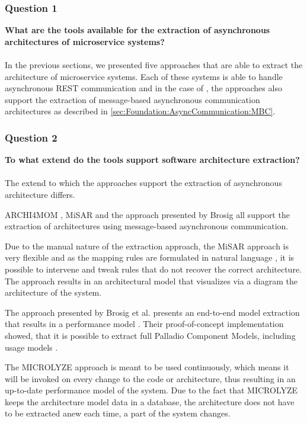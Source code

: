\subsubsection{Question 1}
\textbf{What are the tools available for the extraction of asynchronous architectures of microservice systems?}
\\ \\
In the previous sections, we presented five approaches that are able to extract the architecture of microservice systems.
Each of these systems is able to handle asynchronous REST communication and in the case of \cite{Singh2022ARCHI4MOM,Alshuqayran2018MiSAR,Brosig2011}, the approaches also support the extraction of message-based asynchronous communication architectures as described in \autoref{sec:Foundation:AsyncCommunication:MBC}.

\subsubsection{Question 2}
\textbf{To what extend do the tools support software architecture extraction?}
\\ \\
The extend to which the approaches support the extraction of asynchronous architecture differs.

ARCHI4MOM \cite{Singh2022ARCHI4MOM}, MiSAR \cite{Alshuqayran2018MiSAR} and the approach presented by Brosig \cite{Brosig2011} all support the extraction of architectures using message-based asynchronous communication.

Due to the manual nature of the extraction approach, the MiSAR approach is very flexible and as the mapping rules are formulated in natural language \cite{Alshuqayran2020Thesis}, it is possible to intervene and tweak rules that do not recover the correct architecture.
The approach results in an architectural model that visualizes via a diagram the architecture of the system.

The approach presented by Brosig et al. presents an end-to-end model extraction that results in a performance model \cite{Brosig2011}.
Their proof-of-concept implementation showed, that it is possible to extract full Palladio Component Models, including usage models \cite{Brosig2011}.

The MICROLYZE approach is meant to be used continuously, which means it will be invoked on every change to the code or architecture, thus resulting in an up-to-date performance model of the system.
Due to the fact that MICROLYZE keeps the architecture model data in a database, the architecture does not have to be extracted anew each time, a part of the system changes.

